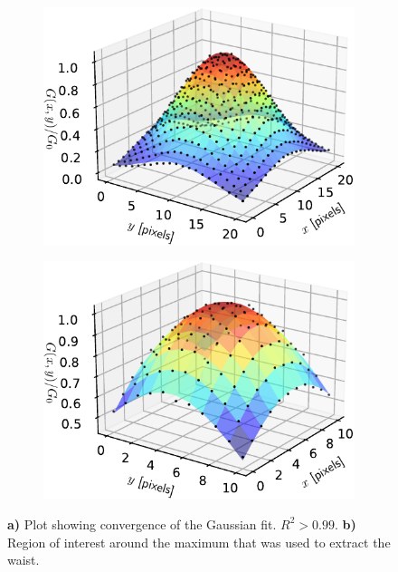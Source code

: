 \begin{figure}
\centering
	\begin{subfigure}{.49\textwidth}
	    \centering
		\includegraphics[width=0.96\linewidth]{figures/3DSpotFitGaussian.pdf}
		\caption{}
		\label{fig:3Dshowing}
	\end{subfigure}
	\begin{subfigure}{.49\textwidth}
		\centering
		\includegraphics[width=0.96\linewidth]{figures/3DSpotFitGaussianSmaller.pdf}
		\caption{}
		\label{fig:3Dwaistfit}
	\end{subfigure}
	\caption{\textbf{a)} Plot showing convergence of the Gaussian fit. $R^2 > 0.99$.
	\textbf{ b)} Region of interest around the maximum that was used to extract the waist.}
	\label{fig:3Dfits}
\end{figure}


